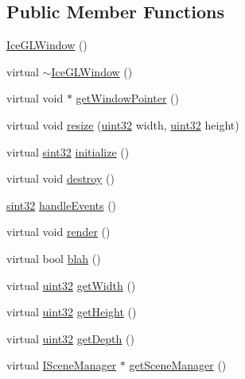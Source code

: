 \subsection*{Public Member Functions}
\begin{DoxyCompactItemize}
\item 
\hyperlink{classicee_1_1engine_1_1IceGLWindow_a64f8470f65c29040b7abdf6aba331e21}{IceGLWindow} ()
\item 
virtual \hyperlink{classicee_1_1engine_1_1IceGLWindow_a990d8f38eacca70830b9b7e1b59083d0}{$\sim$IceGLWindow} ()
\item 
virtual void $\ast$ \hyperlink{classicee_1_1engine_1_1IceGLWindow_af041e4ce63d97bb82867dfc03b12c0d7}{getWindowPointer} ()
\item 
virtual void \hyperlink{classicee_1_1engine_1_1IceGLWindow_a130ecba0ab9ae8d73e86726232be532a}{resize} (\hyperlink{namespacecompatibility_a51e8fe2956b4f39fe1fae96cec0d8393}{uint32} width, \hyperlink{namespacecompatibility_a51e8fe2956b4f39fe1fae96cec0d8393}{uint32} height)
\item 
virtual \hyperlink{namespacecompatibility_afc3ea6dfbdda98c9d2615b235b140a18}{sint32} \hyperlink{classicee_1_1engine_1_1IceGLWindow_a58bbfb06402448f1e7791d699ce084b3}{initialize} ()
\item 
virtual void \hyperlink{classicee_1_1engine_1_1IceGLWindow_ad6fa5825e2205d7f2a93da5bfd0dfbcb}{destroy} ()
\item 
\hyperlink{namespacecompatibility_afc3ea6dfbdda98c9d2615b235b140a18}{sint32} \hyperlink{classicee_1_1engine_1_1IceGLWindow_a6b1aa21ff2b90a665647df912166d33a}{handleEvents} ()
\item 
virtual void \hyperlink{classicee_1_1engine_1_1IceGLWindow_a766acd9860c1d9160706f168105e72a5}{render} ()
\item 
virtual bool \hyperlink{classicee_1_1engine_1_1IceGLWindow_ab686b165d4359e0666dc2214e3d96117}{blah} ()
\item 
virtual \hyperlink{namespacecompatibility_a51e8fe2956b4f39fe1fae96cec0d8393}{uint32} \hyperlink{classicee_1_1engine_1_1IceGLWindow_addcb63afdfd392ded686eae4e8fe5f03}{getWidth} ()
\item 
virtual \hyperlink{namespacecompatibility_a51e8fe2956b4f39fe1fae96cec0d8393}{uint32} \hyperlink{classicee_1_1engine_1_1IceGLWindow_abd215ddc49ebe774a942c27c46b7acee}{getHeight} ()
\item 
virtual \hyperlink{namespacecompatibility_a51e8fe2956b4f39fe1fae96cec0d8393}{uint32} \hyperlink{classicee_1_1engine_1_1IceGLWindow_a979ae0c471ae0b216ad8762a0c3cfe2a}{getDepth} ()
\item 
virtual \hyperlink{classicee_1_1engine_1_1ISceneManager}{ISceneManager} $\ast$ \hyperlink{classicee_1_1engine_1_1IceGLWindow_a5b181115911d51611e2ba50fddc6f8d9}{getSceneManager} ()
\end{DoxyCompactItemize}
